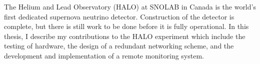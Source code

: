 
The Helium and Lead Observatory (HALO) at SNOLAB in Canada is the world's first dedicated supernova neutrino detector. Construction of the detector is complete, but there is still work to be done before it is fully operational. In this thesis, I describe my contributions to the HALO experiment which include the testing of hardware, the design of a redundant networking scheme, and the development and implementation of a remote monitoring system.

